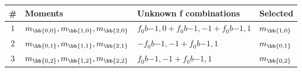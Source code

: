 \begin{table}[!h]
\centering
\begin{tabular}{c l l l}
\toprule
\# & Moments & Unknown f combinations & Selected\\
\midrule
\multirow{ 1}{*}{$1$} & \multirow{ 1}{*}{$m_\bb{0,0}, m_\bb{1,0}, m_\bb{2,0}$} & $f_0b{-1,0}+f_0b{-1,-1}+f_0b{-1,1}$ & \multirow{ 1}{*}{$m_\bb{1,0}$}\\ 
\midrule
\multirow{ 1}{*}{$2$} & \multirow{ 1}{*}{$m_\bb{0,1}, m_\bb{1,1}, m_\bb{2,1}$} & $-f_0b{-1,-1}+f_0b{-1,1}$ & \multirow{ 1}{*}{$m_\bb{0,1}$}\\ 
\midrule
\multirow{ 1}{*}{$3$} & \multirow{ 1}{*}{$m_\bb{0,2}, m_\bb{1,2}, m_\bb{2,2}$} & $f_0b{-1,-1}+f_0b{-1,1}$ & \multirow{ 1}{*}{$m_\bb{0,2}$}\\ 
\bottomrule
\end{tabular}\end{table}
